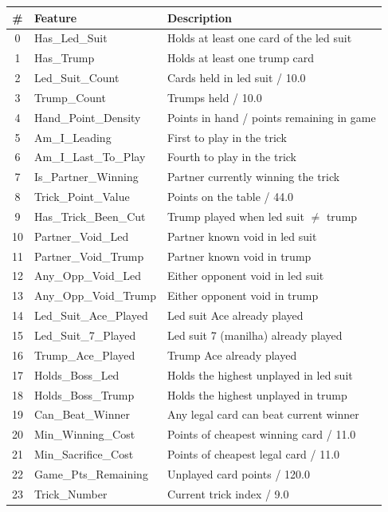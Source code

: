\documentclass[runningheads]{llncs}
\begin{document}
\small
\begin{tabular}{clp{6.5cm}}
\toprule
\textbf{\#} & \textbf{Feature} & \textbf{Description} \\
\midrule
0  & Has\_Led\_Suit      & Holds at least one card of the led suit \\
1  & Has\_Trump          & Holds at least one trump card \\
2  & Led\_Suit\_Count    & Cards held in led suit / 10.0 \\
3  & Trump\_Count        & Trumps held / 10.0 \\
4  & Hand\_Point\_Density& Points in hand / points remaining in game \\
5  & Am\_I\_Leading      & First to play in the trick \\
6  & Am\_I\_Last\_To\_Play& Fourth to play in the trick \\
7  & Is\_Partner\_Winning& Partner currently winning the trick \\
8  & Trick\_Point\_Value & Points on the table / 44.0 \\
9  & Has\_Trick\_Been\_Cut& Trump played when led suit $\neq$ trump \\
10 & Partner\_Void\_Led  & Partner known void in led suit \\
11 & Partner\_Void\_Trump& Partner known void in trump \\
12 & Any\_Opp\_Void\_Led & Either opponent void in led suit \\
13 & Any\_Opp\_Void\_Trump& Either opponent void in trump \\
14 & Led\_Suit\_Ace\_Played& Led suit Ace already played \\
15 & Led\_Suit\_7\_Played& Led suit 7 (manilha) already played \\
16 & Trump\_Ace\_Played  & Trump Ace already played \\
17 & Holds\_Boss\_Led    & Holds the highest unplayed in led suit \\
18 & Holds\_Boss\_Trump  & Holds the highest unplayed in trump \\
19 & Can\_Beat\_Winner   & Any legal card can beat current winner \\
20 & Min\_Winning\_Cost  & Points of cheapest winning card / 11.0 \\
21 & Min\_Sacrifice\_Cost& Points of cheapest legal card / 11.0 \\
22 & Game\_Pts\_Remaining& Unplayed card points / 120.0 \\
23 & Trick\_Number       & Current trick index / 9.0 \\

\end{tabular}
\end{document}
